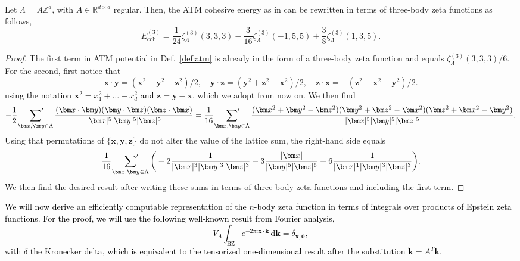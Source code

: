 \documentclass[]{amsart}
\numberwithin{mythm}{section}
\newcommand{\new}[1]{{\textcolor{black}{#1}}}
\begin{document}
\begin{proposition}
    Let $\Lambda = A\mathds Z^d$, with $A\in \mathds R^{d\times d}$ regular. Then, the ATM cohesive energy as in  can be rewritten in terms of three-body zeta functions as follows,
    \[
    E^{(3)}_\mathrm{coh}
    = \frac{1}{24}\zeta_\Lambda^{(3)}(3,3,3) - \frac{3}{16} \zeta_\Lambda^{(3)}(-1,5,5)+\frac{3}{8} \zeta_\Lambda^{(3)}(1,3,5).
    \]
\end{proposition}
\begin{proof}
The first term in ATM potential in Def.~\ref{def:atm} is already in the form of a three-body zeta function and equals $ \zeta_{\Lambda}^{(3)}(3,3,3)/6$. 
    For the second, first notice that 
    \[
\bm{x}\cdot \bm{y} = (\bm{x}^2+\bm{y}^2-\bm{z}^2)/2,\quad
\bm{y}\cdot \bm{z} = (\bm{y}^2+\bm{z}^2-\bm{x}^2)/2,\quad
 \bm{z}\cdot \bm{x} =- (\bm{z}^2 + \bm{x}^2-\bm{y}^2)/2.
   \]
    \new{using the notation $\bm x^2=x_1^2+\dots+x_d^2$ and} $\bm z=\bm y-\bm x$, which we adopt from now on. We then find
    \[
    -\frac{1}{2}\,\sideset{}{'}\sum_{\bm x,\bm y\in \Lambda} \frac{(\bm x\cdot \bm y)(\bm y\cdot \bm z)(\bm z\cdot \bm x)}{\vert \bm x \vert^{5}\vert \bm y \vert^{5}\vert \bm  z\vert^{5}} = \frac{1}{16}\,\sideset{}{'}\sum_{\bm x,\bm y\in \Lambda} \frac{(\bm x^2+\bm y^2-\bm z^2)(\bm y^2+\bm z^2-\bm x^2)(\bm z^2+\bm x^2-\bm y^2)}{\vert \bm x \vert^{5}\vert \bm y \vert^{5}\vert \bm  z\vert^{5}}.
    \]
    Using that permutations of $\{\bm x,\bm y,\bm z\}$ do not alter the value of the lattice sum, the right-hand side equals
    \[
    \frac{1}{16}\,\sideset{}{'}\sum_{\bm x,\bm y\in \Lambda} \bigg(- 2 \frac{1}{\vert \bm x \vert^{3}\vert \bm y \vert^{3}\vert \bm  z\vert^{3}}-3 \frac{\vert \bm x\vert}{\vert \bm y \vert^{5}\vert \bm  z\vert^{5}} + 6 \frac{1}{\vert \bm x \vert^{1}\vert \bm y \vert^{3}\vert \bm  z\vert^{3} } \bigg).
    \]
    We then find the desired result after writing these sums in terms of three-body zeta functions and including the \new{first} term.
\end{proof}


\new{We will now derive an efficiently computable representation of the $n$-body zeta function in terms of integrals over products of Epstein zeta functions. For the proof, we \new{will use the following well-known result from Fourier analysis,}
    \[
    V_\Lambda \int_{\mathrm{BZ}} e^{-2\pi i \bm x\cdot \bm k}\,\mathrm d \bm k = \delta_{\bm x,\bm 0},
    \]
with $\delta$ the Kronecker delta, which is equivalent to the tensorized one-dimensional result after the substitution $\tilde{\bm k}=A^T \bm k$.}
\end{document}
